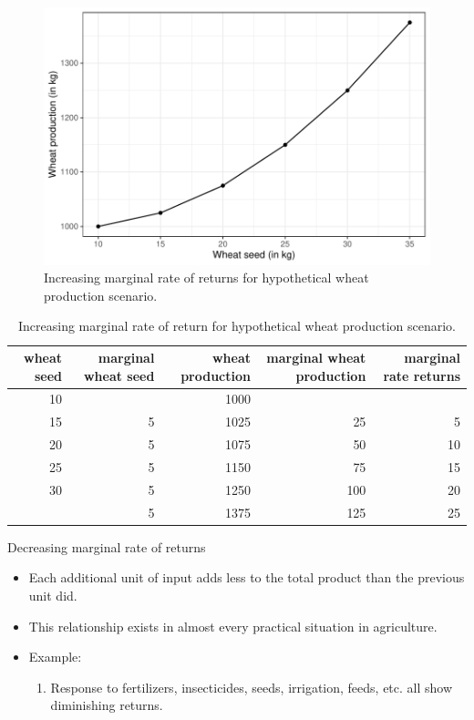 \documentclass[12pt,ignorenonframetext,aspectratio=169]{beamer}
\providecommand{\tightlist}{%
  \setlength{\itemsep}{0pt}\setlength{\parskip}{0pt}}
\begin{document}
\begin{frame}{}
\protect\hypertarget{section-5}{}
\begin{figure}
\includegraphics[width=0.7\linewidth]{production_relationship_files/figure-beamer/nitrogen-wheat-imr-fig-1} \caption{Increasing marginal rate of returns for hypothetical wheat production scenario.}\label{fig:nitrogen-wheat-imr-fig}
\end{figure}
\end{frame}

\begin{frame}{}
\protect\hypertarget{section-6}{}
\begin{table}

\caption{\label{tab:nitrogen-wheat-imr-tab}Increasing marginal rate of return for hypothetical wheat production scenario.}
\centering
\fontsize{6}{8}\selectfont
\begin{tabular}[t]{rrrrr}
\toprule
wheat seed & marginal wheat seed & wheat production & marginal wheat production & marginal rate returns\\
\midrule
10 &  & 1000 &  & \\
15 & 5 & 1025 & 25 & 5\\
20 & 5 & 1075 & 50 & 10\\
25 & 5 & 1150 & 75 & 15\\
30 & 5 & 1250 & 100 & 20\\
\addlinespace
35 & 5 & 1375 & 125 & 25\\
\bottomrule
\end{tabular}
\end{table}
\end{frame}

\begin{frame}{Decreasing marginal rate of returns}
\protect\hypertarget{decreasing-marginal-rate-of-returns}{}
\begin{itemize}
\tightlist
\item
  Each additional unit of input adds less to the total product than the
  previous unit did.
\item
  This relationship exists in almost every practical situation in
  agriculture.
\item
  Example:

  \begin{enumerate}
  \tightlist
  \item
    Response to fertilizers, insecticides, seeds, irrigation, feeds,
    etc. all show diminishing returns.
  \end{enumerate}
\end{itemize}
\end{frame}
\end{document}
